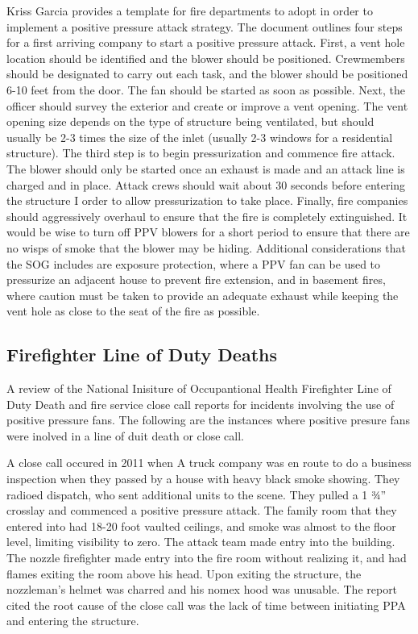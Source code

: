 \documentclass{article}
\begin{document}
Kriss Garcia provides a template for fire departments to adopt in order to implement a positive pressure attack strategy. The document outlines four steps for a first arriving company to start a positive pressure attack. First, a vent hole location should be identified and the blower should be positioned. Crewmembers should be designated to carry out each task, and the blower should be positioned 6-10 feet from the door. The fan should be started as soon as possible. Next, the officer should survey the exterior and create or improve a vent opening. The vent opening size depends on the type of structure being ventilated, but should usually be 2-3 times the size of the inlet (usually 2-3 windows for a residential structure).  The third step is to begin pressurization and commence fire attack. The blower should only be started once an exhaust is made and an attack line is charged and in place. Attack crews should wait about 30 seconds before entering the structure I order to allow pressurization to take place. Finally, fire companies should aggressively overhaul to ensure that the fire is completely extinguished. It would be wise to turn off PPV blowers for a short period to ensure that there are no wisps of smoke that the blower may be hiding. Additional considerations that the SOG includes are exposure protection, where a PPV fan can be used to pressurize an adjacent house to prevent fire extension, and in basement fires, where caution must be taken to provide an adequate exhaust while keeping the vent hole as close to the seat of the fire as possible.\cite{SuggestedSOP}

\subsection{Firefighter Line of Duty Deaths}
A review of the National Inisiture of Occupantional Health Firefighter Line of Duty Death and fire service close call reports for incidents involving the use of positive pressure fans. The following are the instances where positive presure fans were inolved in a line of duit death or close call. 

A close call occured in 2011 when A truck company was en route to do a business inspection when they passed by a house with heavy black smoke showing. They radioed dispatch, who sent additional units to the scene. They pulled a 1 ¾” crosslay and commenced a positive pressure attack. The family room that they entered into had 18-20 foot vaulted ceilings, and smoke was almost to the floor level, limiting visibility to zero. The attack team made entry into the building. The nozzle firefighter made entry into the fire room without realizing it, and had flames exiting the room above his head. Upon exiting the structure, the nozzleman’s helmet was charred and his nomex hood was unusable. The report cited the root cause of the close call was the lack of time between initiating PPA and entering the structure.\cite{VaultedCeilingsFFCC}
\end{document}
